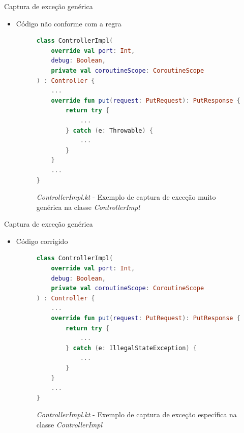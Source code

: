 \documentclass[brazilian]{beamer}
\begin{document}
\begin{frame}[fragile]{Captura de exceção genérica}
    \begin{itemize}
        \item Código não conforme com a regra
        \begin{figure}[H]
    \centering
    \begin{lstlisting}[language=Kotlin]
class ControllerImpl(
    override val port: Int,
    debug: Boolean,
    private val coroutineScope: CoroutineScope
) : Controller {
    ...
    override fun put(request: PutRequest): PutResponse {
        return try {
            ...
        } catch (e: Throwable) {
            ...
        }
    }
    ...
}
    \end{lstlisting}
    \caption{\textit{ControllerImpl.kt} - Exemplo de captura de exceção muito genérica na classe \textit{ControllerImpl}}
    \label{fig:detekt_too_generic_exception_before_example}
\end{figure}
    \end{itemize}
\end{frame}

\begin{frame}[fragile]{Captura de exceção genérica}
    \begin{itemize}
        \item Código corrigido
        \begin{figure}[H]
    \centering
    \begin{lstlisting}[language=Kotlin]
class ControllerImpl(
    override val port: Int,
    debug: Boolean,
    private val coroutineScope: CoroutineScope
) : Controller {
    ...
    override fun put(request: PutRequest): PutResponse {
        return try {
            ...
        } catch (e: IllegalStateException) {
            ...
        }
    }
    ...
}
    \end{lstlisting}
    \caption{\textit{ControllerImpl.kt} - Exemplo de captura de exceção específica na classe \textit{ControllerImpl}}
    \label{fig:detekt_too_generic_exception_after_example}
\end{figure}
    \end{itemize}
\end{frame}
\end{document}
